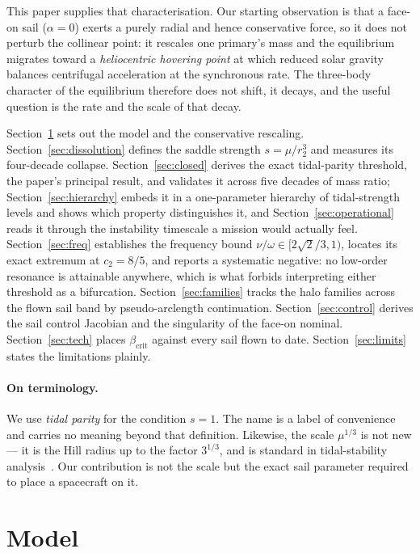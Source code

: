 \documentclass[pdflatex,sn-mathphys-num]{sn-jnl}
\begin{document}
This paper supplies that characterisation. Our starting observation is that a
face-on sail ($\alpha=0$) exerts a purely radial and hence conservative force,
so it does not perturb the collinear point: it rescales one primary's mass and
the equilibrium migrates toward a \emph{heliocentric hovering point} at which
reduced solar gravity balances centrifugal acceleration at the synchronous rate.
The three-body character of the equilibrium therefore does not shift, it decays,
and the useful question is the rate and the scale of that decay.

Section~\ref{sec:model} sets out the model and the conservative rescaling.
Section~\ref{sec:dissolution} defines the saddle strength $s=\mu/r_2^3$ and
measures its four-decade collapse. Section~\ref{sec:closed} derives the exact
tidal-parity threshold, the paper's principal result, and validates it across
five decades of mass ratio; Section~\ref{sec:hierarchy} embeds it in a
one-parameter hierarchy of tidal-strength levels and shows which property
distinguishes it, and Section~\ref{sec:operational} reads it through the
instability timescale a mission would actually feel. Section~\ref{sec:freq} establishes the frequency
bound $\nu/\omega\in[2\sqrt2/3,1)$, locates its exact extremum at $c_2=8/5$, and
reports a systematic negative: no low-order resonance is attainable anywhere,
which is what forbids interpreting either threshold as a bifurcation.
Section~\ref{sec:families} tracks the halo families across the flown sail band
by pseudo-arclength continuation. Section~\ref{sec:control} derives the sail
control Jacobian and the singularity of the face-on nominal.
Section~\ref{sec:tech} places $\beta_{\mathrm{crit}}$ against every sail flown
to date. Section~\ref{sec:limits} states the limitations plainly.

\paragraph{On terminology.}
We use \emph{tidal parity} for the condition $s=1$. The name is a label of convenience
and carries no meaning beyond that definition. Likewise, the scale $\mu^{1/3}$ is not new --- it is the Hill radius
up to the factor $3^{1/3}$, and is standard in tidal-stability analysis~\cite{hamilton1992,murray2000}. Our
contribution is not the scale but the exact sail parameter required to place a
spacecraft on it.

\section{Model}\label{sec:model}
\end{document}
